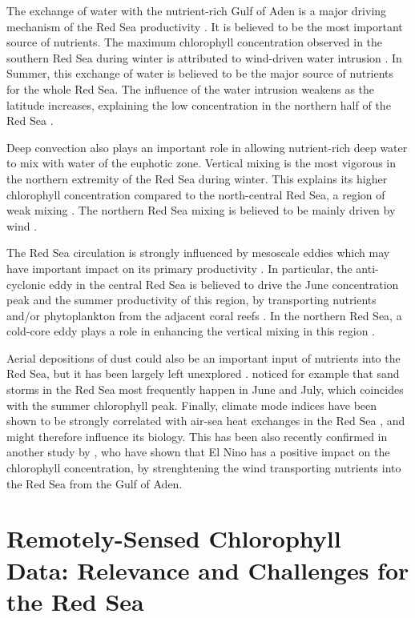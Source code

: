 The exchange of water with the nutrient-rich Gulf of Aden is a major driving
mechanism of the Red Sea productivity \citep{Triantafyllou2014}. It is believed
to be the most important source of nutrients. The maximum chlorophyll
concentration observed in the southern Red Sea during winter is attributed to
wind-driven water intrusion \citep{Raitsos2013, Yao2014}. In Summer, this
exchange of water is believed to be the major source of nutrients for the whole
Red Sea. The influence of the water intrusion weakens as the latitude
increases, explaining the low concentration in the northern half of the Red Sea
\citep{Raitsos2013}.

Deep convection also plays an important role in allowing nutrient-rich deep
water to mix with water of the euphotic zone. Vertical mixing is the most
vigorous in the northern extremity of the Red Sea during winter. This
explains its higher chlorophyll concentration compared to the north-central Red
Sea, a region of weak mixing \citep{Raitsos2013}. The northern Red Sea mixing
is believed to be mainly driven by wind \citep{Raitsos2013}.

The Red Sea circulation is strongly influenced by mesoscale eddies
\citep{Yao2014, Yao2014b, Zhan2014} which may have important impact on its
primary productivity \citep{Zhai2013}. In particular, the anti-cyclonic eddy in
the central Red Sea is believed to drive the June concentration peak and the
summer productivity of this region, by transporting nutrients and/or
phytoplankton from the adjacent coral reefs \citep{Raitsos2013}. In the
northern Red Sea, a cold-core eddy plays a role in enhancing the vertical
mixing in this region \citep{Raitsos2013}.

Aerial depositions of dust could also be an important input of nutrients into
the Red Sea, but it has been largely left unexplored \citep{Triantafyllou2014}.
\citet{Raitsos2013} noticed for example that sand storms in the Red Sea most
frequently happen in June and July, which coincides with the summer chlorophyll
peak. Finally, climate mode indices have been shown to be strongly correlated
with air-sea heat exchanges in the Red Sea \citep{Abualnaja2015}, and might
therefore influence its biology. This has been also recently confirmed in
another study by \citet{Raitsos2015}, who have shown that El Nino has a
positive impact on the chlorophyll concentration, by strenghtening the wind
transporting nutrients into the Red Sea from the Gulf of Aden.

\section{Remotely-Sensed Chlorophyll Data: Relevance and Challenges for the Red
Sea}

